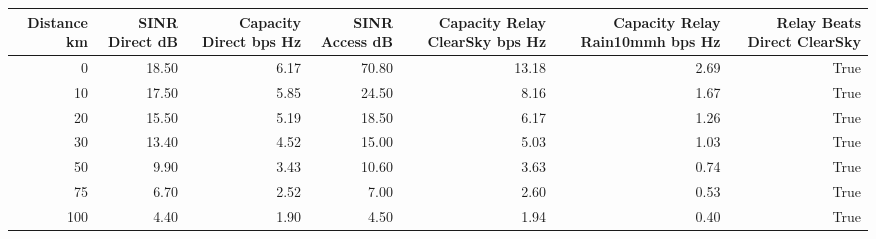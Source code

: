 \begin{tabular}{rrrrrrr}
\toprule
Distance km & SINR Direct dB & Capacity Direct bps Hz & SINR Access dB & Capacity Relay ClearSky bps Hz & Capacity Relay Rain10mmh bps Hz & Relay Beats Direct ClearSky \\
\midrule
0 & 18.50 & 6.17 & 70.80 & 13.18 & 2.69 & True \\
10 & 17.50 & 5.85 & 24.50 & 8.16 & 1.67 & True \\
20 & 15.50 & 5.19 & 18.50 & 6.17 & 1.26 & True \\
30 & 13.40 & 4.52 & 15.00 & 5.03 & 1.03 & True \\
50 & 9.90 & 3.43 & 10.60 & 3.63 & 0.74 & True \\
75 & 6.70 & 2.52 & 7.00 & 2.60 & 0.53 & True \\
100 & 4.40 & 1.90 & 4.50 & 1.94 & 0.40 & True \\
\bottomrule
\end{tabular}
